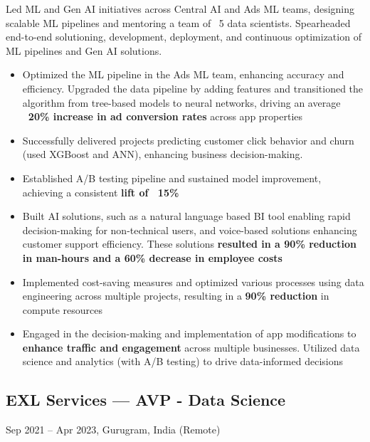 \documentclass[letterpaper,10pt]{article}
\begin{document}
  Led ML and Gen AI initiatives across Central AI and Ads ML teams, designing scalable ML pipelines and mentoring a team of ~5 data scientists. Spearheaded end-to-end solutioning, development, deployment, and continuous optimization of ML pipelines and Gen AI solutions.
  \begin{itemize}[leftmargin=1em]
      \item Optimized the ML pipeline in the Ads ML team, enhancing accuracy and efficiency. Upgraded the data pipeline by adding features and transitioned the algorithm from tree-based models to neural networks, driving an average \textbf{~20\% increase in ad conversion rates} across app properties
      \item Successfully delivered projects predicting customer click behavior and churn (used XGBoost and ANN), enhancing business decision-making.
      \item Established A/B testing pipeline and sustained model improvement, achieving a consistent \textbf{lift of ~15\%}
      \item Built AI solutions, such as a natural language based BI tool enabling rapid decision-making for non-technical users, and voice-based solutions enhancing customer support efficiency. These solutions \textbf{resulted in a 90\% reduction in man-hours and a 60\% decrease in employee costs}
      \item Implemented cost-saving measures and optimized various processes using data engineering across multiple projects, resulting in a \textbf{90\% reduction} in compute resources
      \item Engaged in the decision-making and implementation of app modifications to \textbf{enhance traffic and engagement} across multiple businesses. Utilized data science and analytics (with A/B testing) to drive data-informed decisions
  \end{itemize}

  \subsection*{EXL Services — AVP - Data Science}
  Sep 2021 – Apr 2023, Gurugram, India (Remote)
  \newline {}
\end{document}
